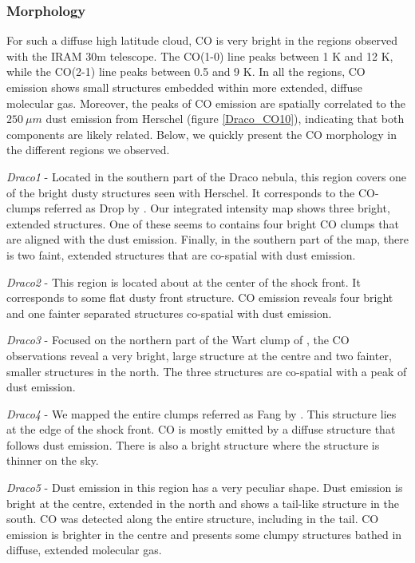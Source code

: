 \documentclass[traditabstract]{aa}
\begin{document}
      \subsubsection{Morphology}

   For such a diffuse high latitude cloud, CO is very bright in the regions observed with the IRAM 30m telescope. The CO(1-0) line peaks between 1 K and 12 K, while the CO(2-1) line peaks between 0.5 and 9 K. In all the regions, CO emission shows small structures embedded within more extended, diffuse molecular gas. Moreover, the peaks of CO emission are spatially correlated to the $250\: \mu m$ dust emission from Herschel (figure \ref{Draco_CO10}), indicating that both components are likely related. Below, we quickly present the CO morphology in the different regions we observed.
\medskip

\noindent \textit{Draco1} - Located in the southern part of the Draco nebula, this region covers one of the bright dusty structures seen with Herschel. It corresponds to the CO-clumps referred as Drop by \cite{Mebold_1985}. Our integrated intensity map shows three bright, extended structures. One of these seems to contains four bright CO clumps that are aligned with the dust emission. Finally, in the southern part of the map, there is two faint, extended structures that are co-spatial with dust emission.
\medskip

\noindent \textit{Draco2} - This region is located about at the center of the shock front. It corresponds to some flat dusty front structure. CO emission reveals four bright and one fainter separated structures co-spatial with dust emission.
\medskip

\noindent \textit{Draco3} - Focused on the northern part of the Wart clump of \cite{Mebold_1985}, the CO observations reveal a very bright, large structure at the centre and two fainter, smaller structures in the north. The three structures are co-spatial with a peak of dust emission.
\medskip

\noindent \textit{Draco4} - We mapped the entire clumps referred as Fang by \cite{Mebold_1985}. This structure lies at the edge of the shock front. CO is mostly emitted by a diffuse structure that follows dust emission. There is also a bright structure where the structure is thinner on the sky.
\medskip

\noindent \textit{Draco5} - Dust emission in this region has a very peculiar shape. Dust emission is bright at the centre, extended in the north and shows a tail-like structure in the south. CO was detected along the entire structure, including in the tail. CO emission is brighter in the centre and presents some clumpy structures bathed in diffuse, extended molecular gas.
\medskip
\end{document}
